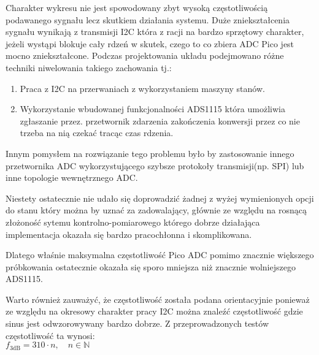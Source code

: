     Charakter wykresu nie jest spowodowany zbyt wysoką częstotliwością podawanego
    sygnału lecz skutkiem działania systemu. Duże zniekształcenia sygnału wynikają
    z transmisji I2C która z racji na bardzo sprzętowy charakter, jeżeli wystąpi blokuje
    cały rdzeń w skutek, czego to co zbiera ADC Pico jest mocno zniekształcone.
    Podczas projektowania układu podejmowano różne techniki niwelowania takiego zachowania tj.: 
    \begin{enumerate}
        \item Praca z I2C na przerwaniach z wykorzystaniem maszyny stanów.
        \item Wykorzystanie wbudowanej funkcjonalności ADS1115 która umożliwia zgłaszanie przez.
        przetwornik zdarzenia zakończenia konwersji przez co nie trzeba na nią czekać tracąc czas
        rdzenia.
    \end{enumerate}

    Innym pomysłem na rozwiązanie tego problemu było by zastosowanie innego przetwornika ADC wykorzystującego szybsze protokoły transmisji(np. SPI)
    lub inne topologie wewnętrznego ADC.

    Niestety ostatecznie nie udało się doprowadzić żadnej z wyżej wymienionych opcji do stanu
    który można by uznać za zadowalający, głównie ze względu na rosnącą złożoność sytemu kontrolno-pomiarowego
    którego dobrze działająca implementacja okazała się bardzo pracochłonna i skomplikowana.
    
    Dlatego właśnie maksymalna częstotliwość Pico ADC pomimo znacznie większego
    próbkowania ostatecznie okazała się sporo mniejsza niż znacznie wolniejszego ADS1115.  

    Warto również zauważyć, że częstotliwość została podana orientacyjnie ponieważ ze względu
    na okresowy charakter pracy I2C można znaleźć częstotliwość gdzie sinus jest odwzorowywany bardzo dobrze.
    Z przeprowadzonych testów częstotliwość ta wynosi:
    \\$f_{3\mathrm{dB}} = 310 \cdot n, \quad n \in \mathbb{N}$